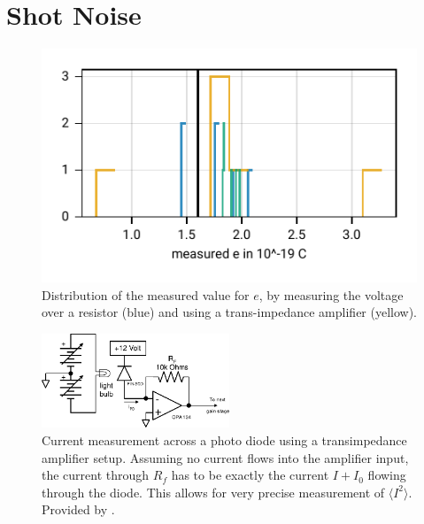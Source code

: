 \documentclass[
    parskip=half, 
    twoside=false,
    twocolumn=true,
    fontsize=11pt,
]{scrarticle}
\begin{document}
\section{Shot Noise}
\begin{figure}[h!]
    \centering
    \includegraphics{figures/03 shot noise.pdf}
    \caption{
        Distribution of the measured value for $e$, by measuring the voltage over a resistor (blue) and using a trans-impedance amplifier (yellow).
    }
    \label{fig:shot noise}
\end{figure}
\begin{figure}[h!]
    \centering
    \includegraphics[width=0.5\textwidth]{figures/tamp_schematic.pdf}
    \caption{
        Current measurement across a photo diode using a transimpedance amplifier setup. Assuming no current flows into the amplifier input, the current through $R_f$ has to be exactly the current $I + I_0$ flowing through the diode. This allows for very precise measurement of $\langle I^2 \rangle$.
        Provided by \autocite{instructions}.
    }
    \label{fig:transimpedance schematic}
\end{figure}
\end{document}

